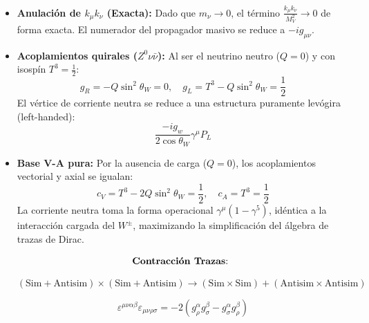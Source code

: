 \begin{itemize}
    \item \textbf{Anulación de $k_\mu k_\nu$ (Exacta):} Dado que $m_\nu \to 0$, el término $\frac{k_\mu k_\nu}{M_V^2} \to 0$ de forma exacta. El numerador del propagador masivo se reduce a $-ig_{\mu\nu}$.

    \item \textbf{Acoplamientos quirales ($Z^0\nu\bar{\nu}$):} Al ser el neutrino neutro ($Q=0$) y con isospín $T^3 = \frac{1}{2}$:
    \[ g_R = -Q \sin^2\theta_W = 0, \quad g_L = T^3 - Q \sin^2\theta_W = \frac{1}{2} \]
    El vértice de corriente neutra se reduce a una estructura puramente levógira (left-handed):
    \[ \frac{-ig_w}{2\cos\theta_W} \gamma^\mu P_L \]
    
    \item \textbf{Base V-A pura:} Por la ausencia de carga ($Q=0$), los acoplamientos vectorial y axial se igualan:
    \[ c_V = T^3 - 2Q\sin^2\theta_W = \frac{1}{2}, \quad c_A = T^3 = \frac{1}{2} \]
    La corriente neutra toma la forma operacional $\gamma^\mu(1-\gamma^5)$, idéntica a la interacción cargada del $W^\pm$, maximizando la simplificación del álgebra de trazas de Dirac.


    $$\text{\textbf{Contracción Trazas}: }$$
    
    $$(\text{Sim} + \text{Antisim}) \times (\text{Sim} + \text{Antisim}) \longrightarrow (\text{Sim} \times \text{Sim}) + (\text{Antisim} \times \text{Antisim})$$


$$\varepsilon^{\mu\nu\alpha\beta} \varepsilon_{\mu\nu\rho\sigma} = -2(g^\alpha_\rho g^\beta_\sigma - g^\alpha_\sigma g^\beta_\rho)$$
    
\end{itemize}




